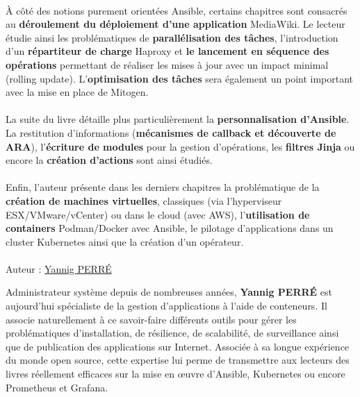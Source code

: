 \documentclass[hidelinks]{article}
\begin{document}
\paragraph{}
À côté des notions purement orientées Ansible, certains chapitres sont consacrés au \textbf{déroulement du déploiement d'une application} MediaWiki. Le lecteur étudie ainsi les problématiques de \textbf{parallélisation des tâches}, l'introduction d'un \textbf{répartiteur de charge} Haproxy et \textbf{le lancement en séquence des opérations} permettant de réaliser les mises à jour avec un impact minimal (rolling update). L'\textbf{optimisation des tâches} sera également un point important avec la mise en place de Mitogen.

\paragraph{}
La suite du livre détaille plus particulièrement la \textbf{personnalisation d'Ansible}. La restitution d'informations (\textbf{mécanismes de callback et découverte de ARA}), l'\textbf{écriture de modules} pour la gestion d'opérations, les \textbf{filtres Jinja} ou encore la \textbf{création d'actions} sont ainsi étudiés.

\paragraph{}
Enfin, l'auteur présente dans les derniers chapitres la problématique de la \textbf{création de machines virtuelles}, classiques (via l'hyperviseur ESX/VMware/vCenter) ou dans le cloud (avec AWS), l'\textbf{utilisation de containers} Podman/Docker avec Ansible, le pilotage d'applications dans un cluster Kubernetes ainsi que la création d'un opérateur.

\paragraph{}
Auteur : \underline{Yannig PERRÉ}

Administrateur système depuis de nombreuses années, \textbf{Yannig PERRÉ} est aujourd'hui spécialiste de la gestion d'applications à l'aide de conteneurs. Il associe naturellement à ce savoir-faire différents outils pour gérer les problématiques d'installation, de résilience, de scalabilité, de surveillance ainsi que de publication des applications sur Internet. Associée à sa longue expérience du monde open source, cette expertise lui perme de transmettre aux lecteurs des livres réellement efficaces sur la mise en \oe{}uvre d'Ansible, Kubernetes ou encore Prometheus et Grafana.
\end{document}
